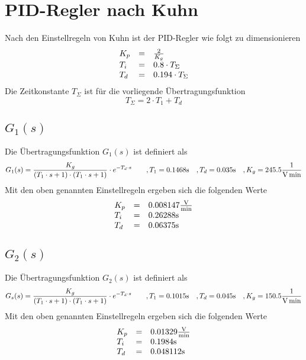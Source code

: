 \section{PID-Regler nach Kuhn}
Nach den Einstellregeln von Kuhn ist der PID-Regler wie folgt zu dimensionieren
\[
	\begin{array}{l c l}
		K_p & = & \frac{2}{K_g} \\
		T_i & = & 0.8 \cdot T_\Sigma \\
		T_d & = & 0.194 \cdot T_\Sigma
	\end{array}
\]
Die Zeitkonstante $T_\Sigma$ ist für die vorliegende Übertragungsfunktion
\[
	T_\Sigma = 2 \cdot T_1 + T_d
\]


\subsection{$G_1(s)$}
Die Übertragungsfunktion $G_1(s)$ ist definiert als
\[
	G_1(s)
	= \frac{K_g}{(T_1 \cdot s + 1)
		\cdot (T_1 \cdot s + 1)}
		\cdot e^{-T_d \cdot s}
	\qquad ,T_1 = 0.1468 \si{\second}
	\quad ,T_d = 0.035 \si{\second}
	\quad ,K_g = 245.5 \si[per-mode=fraction]{\per\volt\per\minute}
\]
Mit den oben genannten Einstellregeln ergeben sich die folgenden Werte
\[
	\begin{array}{l c l}
		K_p & = & 0.008147 \si[per-mode=fraction]{\volt\per\minute} \\
		T_i & = & 0.26288 \si{\second} \\
		T_d & = & 0.06375 \si{\second} 
	\end{array}
\]

\subsection{$G_2(s)$}
Die Übertragungsfunktion $G_2(s)$ ist definiert als
\[
	G_s(s)
	= \frac{K_g}{(T_1 \cdot s + 1)
		\cdot (T_1 \cdot s + 1)}
		\cdot e^{-T_d \cdot s}
	\qquad ,T_1 = 0.1015 \si{\second}
	\quad ,T_d = 0.045 \si{\second}
	\quad ,K_g = 150.5 \si[per-mode=fraction]{\per\volt\per\minute}
\]
Mit den oben genannten Einstellregeln ergeben sich die folgenden Werte
\[
	\begin{array}{l c l}
		K_p & = & 0.01329 \si[per-mode=fraction]{\volt\per\minute} \\
		T_i & = & 0.1984 \si{\second} \\
		T_d & = & 0.048112 \si{\second} 
	\end{array}
\]


